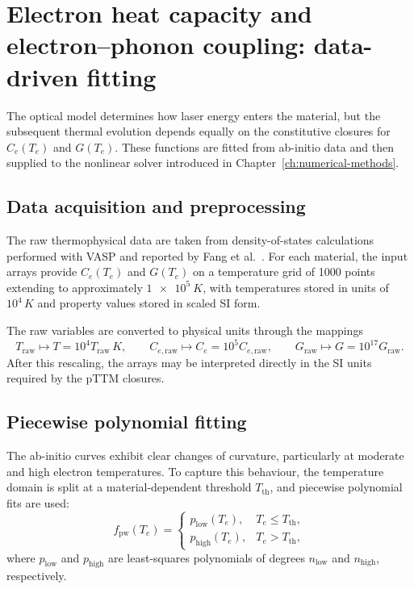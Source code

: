 \section{Electron heat capacity and electron--phonon coupling: data-driven fitting}
\label{sec:ch3-fitting}

The optical model determines how laser energy enters the material, but
the subsequent thermal evolution depends equally on the constitutive
closures for \(C_e(T_e)\) and \(G(T_e)\).
These functions are fitted from ab-initio data and then supplied to the nonlinear solver introduced in
Chapter~\ref{ch:numerical-methods}.

\subsection{Data acquisition and preprocessing}
\label{sec:ch3-fitting-data}

The raw thermophysical data are taken from density-of-states calculations
performed with VASP and reported by Fang et al.~\cite{Fang_2012}. For
each material, the input arrays provide \(C_e(T_e)\) and \(G(T_e)\) on a
temperature grid of 1000 points extending to approximately
\(\SI{1e5}{K}\), with temperatures stored in units of \(10^4\,\si{K}\) and
property values stored in scaled SI form.

The raw variables are converted to physical units through the mappings
\[
    T_{\mathrm{raw}}
    \mapsto
    T = 10^4 T_{\mathrm{raw}}\,\si{K},
    \qquad
    C_{e,\mathrm{raw}}
    \mapsto
    C_e = 10^5 C_{e,\mathrm{raw}},
    \qquad
    G_{\mathrm{raw}}
    \mapsto
    G = 10^{17} G_{\mathrm{raw}}.
\]
After this rescaling, the arrays may be interpreted directly in the SI
units required by the pTTM closures.

\subsection{Piecewise polynomial fitting}
\label{sec:ch3-fitting-poly}

The ab-initio curves exhibit clear changes of curvature, particularly at
moderate and high electron temperatures. To capture this behaviour, the
temperature domain is split at a material-dependent threshold
\(T_{\mathrm{th}}\), and piecewise polynomial fits are used:
\begin{equation}
    f_{\mathrm{pw}}(T_e)
    =
    \begin{cases}
        p_{\mathrm{low}}(T_e),  & T_e \leq T_{\mathrm{th}}, \\
        p_{\mathrm{high}}(T_e), & T_e > T_{\mathrm{th}},
    \end{cases}
    \label{eq:ch3-piecewise-poly}
\end{equation}
where \(p_{\mathrm{low}}\) and \(p_{\mathrm{high}}\) are least-squares
polynomials of degrees \(n_{\mathrm{low}}\) and \(n_{\mathrm{high}}\),
respectively.

